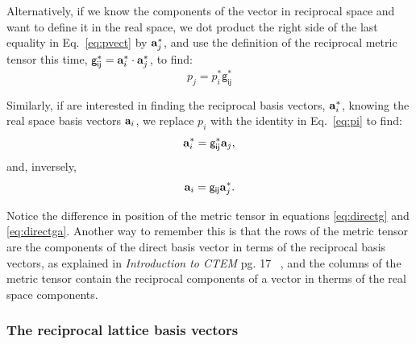 Alternatively, if we know the components of the vector in reciprocal space and want to define it in the real space, we dot product the right side of the last equality in Eq.~\ref{eq:pvect} by $\vb{a}^*_j$, and use the definition of the reciprocal metric tensor this time, $\mathsf{g^*_{ij}}=\vb{a}^*_i\cdot\vb{a}^*_j$, to find:
\begin{equation}
\label{eq:pi}
p_j=p_i^* \mathsf{g^*_{ij}}
\end{equation}

Similarly, if are interested in finding the reciprocal basis vectors, $\vb{a}^*_i$, knowing the real space basis vectors $\vb{a}_i$, we replace $p_i$ with the identity in Eq.~\ref{eq:pi} to find:
\begin{equation}
\label{eq:astar}
\vb{a}^*_i=\mathsf{g^*_{ij}} \mathbf{a}_j,
\end{equation}
and, inversely, 
\begin{equation}
\label{eq:directga}
\vb{a}_i=\mathsf{g_{ij}} \mathbf{a}^*_j.
\end{equation}

Notice the difference in position of the metric tensor in equations \ref{eq:directg} and \ref{eq:directga}. Another way to remember this is that the rows of the metric tensor are the components of the direct basis vector in terms of the reciprocal basis vectors, as explained in \textit{Introduction to CTEM} pg. 17 ~\cite{MarcTEM03}, and the columns of the metric tensor contain the reciprocal components of a vector in therms of the real space components. 


\subsubsection{The reciprocal lattice basis vectors}
\label{sec:crossProd}


